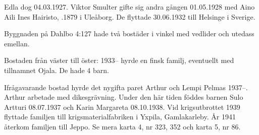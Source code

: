 Edla dog 04.03.1927. Viktor Smulter gifte sig andra gången 01.05.1928 med Aino Aili Ines Hairisto, .1879 i Uleåborg. De flyttade 30.06.1932 till Helsinge i Sverige.


Byggnaden på Dahlbo 4:127 hade två bostäder i vinkel med vedlider och	utedass emellan.

Bostaden från väster till öster:
1933-- hyrde en finsk familj, eventuellt med tillnamnet Ojala. De hade 4 barn.

Ifrågavarande bostad hyrde det nygifta paret Arthur och Lempi	Pelmas 1937--. Arthur arbetade med dikesgrävning. Under den	här tiden föddes barnen Sulo Artturi 08.07.1937 och Karin	Margareta	08.10.1938. Vid krigsutbrottet 1939 flyttade familjen till	krigsmaterialfabriken i Yxpila, Gamlakarleby. År 1941 återkom familjen till Jeppo. Se mera karta 4, nr 323, 352 och karta 5, nr 86.


